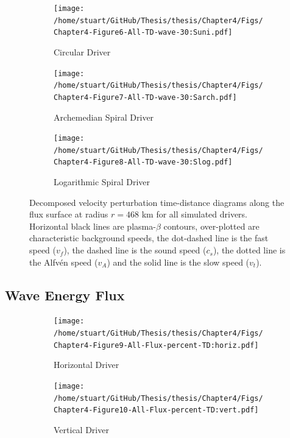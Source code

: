 \documentclass[a4paper,12pt,fourier,authoryear,custommargin]{Classes/PhDThesisPSnPDF}
\begin{document}
\begin{figure}
    \centering
\ContinuedFloat


    \begin{subfigure}[b]{0.9\columnwidth}
        \texttt{[image: /home/stuart/GitHub/Thesis/thesis/Chapter4/Figs/Chapter4-Figure6-All-TD-wave-30:Suni.pdf]}
        \caption{Circular Driver}
        \label{fig:All-TD-wave-30:Suni}
    \end{subfigure}

    \begin{subfigure}[b]{0.9\columnwidth}
        \texttt{[image: /home/stuart/GitHub/Thesis/thesis/Chapter4/Figs/Chapter4-Figure7-All-TD-wave-30:Sarch.pdf]}
        \caption{Archemedian Spiral Driver}
        \label{fig:All-TD-wave-30:Sarch}
    \end{subfigure}
    \caption{}
    \label{fig:}
\end{figure}

\begin{figure}
    \centering
\ContinuedFloat


    \begin{subfigure}[b]{0.9\columnwidth}
        \texttt{[image: /home/stuart/GitHub/Thesis/thesis/Chapter4/Figs/Chapter4-Figure8-All-TD-wave-30:Slog.pdf]}
        \caption{Logarithmic Spiral Driver}
        \label{fig:All-TD-wave-30:Slog}
    \end{subfigure}
    \caption{Decomposed velocity perturbation time-distance diagrams along the flux surface at radius $r = 468$ km for all simulated drivers. Horizontal black lines are plasma-$\beta$ contours, over-plotted are characteristic background speeds, the dot-dashed line is the fast speed ($v_f$), the dashed line is the sound speed ($c_s$), the dotted line is the Alfv\'en speed ($v_A$) and the solid line is the slow speed ($v_t$).}
    \label{fig:All-TD-wave-30}
\end{figure}


\subsection{Wave Energy Flux}\label{sec:energy_flux}



\begin{figure}
    \centering


    \begin{subfigure}[b]{0.9\columnwidth}
        \texttt{[image: /home/stuart/GitHub/Thesis/thesis/Chapter4/Figs/Chapter4-Figure9-All-Flux-percent-TD:horiz.pdf]}
        \caption{Horizontal Driver}
        \label{fig:All-Flux-percent-TD:horiz}
    \end{subfigure}

    \begin{subfigure}[b]{0.9\columnwidth}
        \texttt{[image: /home/stuart/GitHub/Thesis/thesis/Chapter4/Figs/Chapter4-Figure10-All-Flux-percent-TD:vert.pdf]}
        \caption{Vertical Driver}
        \label{fig:All-Flux-percent-TD:vert}
    \end{subfigure}
    \caption{}
    \label{fig:}
\end{figure}
\end{document}
